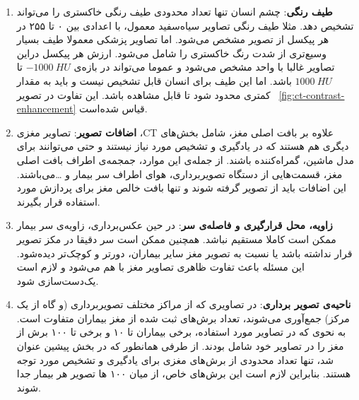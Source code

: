 \begin{enumerate}
        \item \textbf{طیف رنگی}:  چشم انسان تنها تعداد محدودی طیف رنگی خاکستری را می‌تواند تشخیص دهد. مثلا طیف رنگی تصاویر سیاه‌سفید معمول، با اعدادی بین ۰ تا ۲۵۵ در هر پیکسل از تصویر مشخص می‌شود.
        اما تصاویر پزشکی معمولا طیف بسیار وسیع‌تری از شدت رنگ خاکستری را شامل می‌شود. 
        ارزش هر پیکسل دراین تصاویر غالبا با واحد  مشخص می‌شود و عموما می‌تواند در بازه‌ی $-1000\ HU$ تا $1000\ HU$ باشد.
        اما این طیف برای انسان قابل تشخیص نیست و باید به مقدار کمتری محدود شود تا قابل مشاهده باشد. این تفاوت در تصویر ~\ref{fig:ct-contrast-enhancement} 
        قیاس شده‌است.
        \item \textbf{اضافات تصویر}: تصاویر مغزی ،CT علاوه بر بافت اصلی مغز، شامل بخش‌های دیگری هم هستند که در یادگیری و تشخیص مورد نیاز نیستند و حتی می‌توانند برای مدل ماشین، گمراه‌کننده باشند.
        از جمله‌ی این موارد، جمجمه‌ی اطراف بافت اصلی مغز، قسمت‌هایی از دستگاه تصویربرداری، هوای اطراف سر بیمار و \dots می‌باشند.
        این اضافات باید از تصویر گرفته شوند و تنها بافت خالص مغز برای پردازش مورد استفاده قرار بگیرند.
        \item \textbf{زاویه، محل قرار‌گیری و فاصله‌ی سر}: در حین عکس‌برداری، زاویه‌ی سر بیمار ممکن است کاملا مستقیم نباشد.
        همچنین ممکن است سر دقیقا در مکز تصویر قرار نداشته باشد یا نسبت به تصویر مغز سایر بیماران، دورتر و کوچک‌تر دیده‌شود.
        این مسئله باعث تفاوت ظاهری تصاویر مغز با هم می‌شود و لازم است یک‌دست‌سازی شود.
        \item \textbf{ناحیه‌ی تصویر برداری}: در تصاویری که از مراکز مختلف تصویربرداری (و گاه از یک مرکز) جمع‌آوری می‌شوند، 
        تعداد برش‌های ثبت شده از مغز بیماران متفاوت است.
        به نحوی که در تصاویر مورد استفاده، برخی بیماران تا ۱۰ و برخی تا ۱۰۰ برش از مغز را در تصاویر خود شامل بودند.
        از طرفی همانطور که در بخش پیشین عنوان شد، تنها تعداد محدودی از برش‌های مغزی برای یادگیری و تشخیص مورد توجه هستند.
        بنابراین لازم است این برش‌های خاص، از میان ۱۰۰ ها تصویر هر بیمار جدا شوند. 
\end{enumerate}


